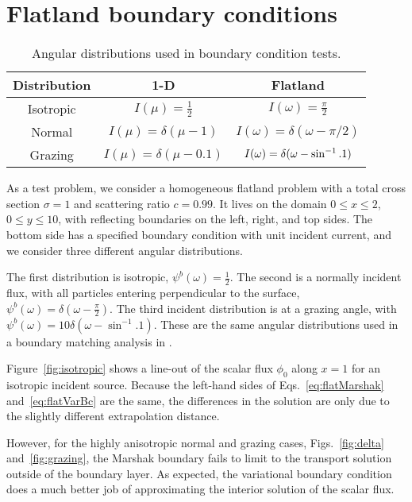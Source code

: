 \clearpage
\section{Flatland boundary conditions}

\begin{table}[htb]
  \centering
  \begin{tabular}{ccc}
\toprule
    Distribution & 1-D & Flatland
\\ \midrule
Isotropic & $I(\mu) = \frac{1}{2}$ & $I(\omega) = \frac{\pi}{2}$
\\
Normal & $I(\mu) = \delta(\mu-1)$ & $I(\omega) = \delta(\omega-\pi/2)$
\\
Grazing & $I(\mu) = \delta(\mu-0.1)$ & $I(\omega) = \delta(\omega-\sin^{-1}.1)$
\\ \bottomrule
  \end{tabular}
  \caption{Angular distributions used in boundary condition tests.}
  \label{tab:angularDistributions}
\end{table}

As a test problem, we consider a homogeneous flatland problem with a
total cross section $\sigma=1$ and scattering ratio $c=0.99$. It lives on the
domain $0 \le x \le 2$, $0 \le y \le 10$, with reflecting boundaries on the left,
right, and top sides. The bottom side has a specified boundary
condition with unit incident current, and we consider three different angular
distributions.

The first distribution is isotropic, $\psi^b(\omega) = \frac{1}{2}$. The second
is a normally incident flux, with all particles entering
perpendicular to the surface, $\psi^b(\omega) = \delta(\omega -
\frac{\pi}{2})$. The third incident distribution is at a grazing angle, with 
$\psi^b(\omega) = 10 \delta(\omega - \sin^{-1}.1)$.
These are the same angular distributions used in a boundary matching analysis
in \cite{Dav2006}.

Figure~\ref{fig:isotropic} shows a line-out of the scalar flux $\phi_0$ along
$x=1$ for an isotropic incident source. Because the left-hand sides of
Eqs.~\eqref{eq:flatMarshak} and~\eqref{eq:flatVarBc} are the same, the
differences in the solution are only due to the slightly different
extrapolation distance.

However, for the highly anisotropic normal and grazing cases,
Figs.~\ref{fig:delta} and~\ref{fig:grazing}, the Marshak boundary fails to
limit to the transport solution outside of the boundary layer. As
expected, the variational boundary condition does a much better job of
approximating the interior solution of the scalar flux.

